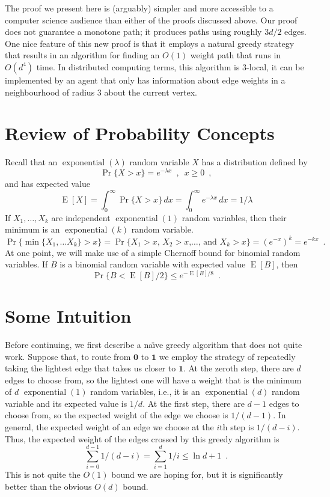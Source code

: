 \documentclass[a4paper,UKenglish]{lipics-v2016}
\DeclareMathOperator{\E}{E}
\DeclareMathOperator{\exponential}{exponential}
\newcommand{\zero}{\mathbf{0}}
\newcommand{\one}{\mathbf{1}}
\begin{document}
The proof we present here is (arguably) simpler and more accessible to
a computer science audience than either of the proofs discussed above.
Our proof does not guarantee a monotone path; it produces paths using
roughly $3d/2$ edges.  One nice feature of this new proof is that
it employs a natural greedy strategy that results in an algorithm for
finding an $O(1)$ weight path that runs in $O(d^4)$ time.  In distributed
computing terms, this algorithm is 3-local, it can be implemented by an
agent that only has information about edge weights in a neighbourhood
of radius 3 about the current vertex.

\section{Review of Probability Concepts}

Recall that an $\exponential(\lambda)$ random variable $X$ has a
distribution defined by
\[
   \Pr\{X > x\} = e^{-\lambda x} \enspace,\enspace x \ge 0 \enspace ,
\]
and has expected value
\[
   \E[X] = \int_0^\infty \Pr\{X>x\}\,dx = \int_0^\infty e^{-\lambda x}\,dx = 1/\lambda
\]
If $X_1,\ldots,X_k$ are independent $\exponential(1)$ random variables,
then their minimum is an $\exponential(k)$ random variable.
\[
   \Pr\{\min\{X_1,\ldots X_k\} > x\} = \Pr\{\text{$X_1>x$, $X_2>x$,\ldots, and $X_k>x$}\} = \left(e^{-x}\right)^k = e^{-kx} \enspace .
\]
At one point, we will make use of a simple Chernoff bound for binomial
random variables. If $B$ is a binomial random variable with expected
value $\E[B]$, then
\begin{equation}\label{eq:chernoff}
   \Pr\{B < \E[B]/2\} \le e^{-\E[B]/8} \enspace .
\end{equation}

\section{Some Intuition}
\label{sec:intuition}

Before continuing, we first describe a na\"{\i}ve greedy algorithm that
does not quite work.  Suppose that, to route from $\zero$ to $\one$ we
employ the strategy of repeatedly taking the lightest edge that
takes us closer to $\one$.  At the zeroth step, there are $d$ edges to
choose from, so the lightest one will have a weight that is the minimum of
$d$ $\exponential(1)$ random variables, i.e., it is an $\exponential(d)$
random variable and its expected value is $1/d$.  At the first step,
there are $d-1$ edges to choose from, so the expected weight of the edge
we choose is $1/(d-1)$. In general, the expected weight of an edge we
choose at the $i$th step is $1/(d-i)$.  Thus, the expected weight of
the edges crossed by this greedy algorithm is
\[
   \sum_{i=0}^{d-1} 1/(d-i) = \sum_{i=1}^d 1/i \le \ln d + 1 \enspace . 
\]
This is not quite the $O(1)$ bound we are hoping for, but it is significantly better than the obvious $O(d)$ bound.
\end{document}
